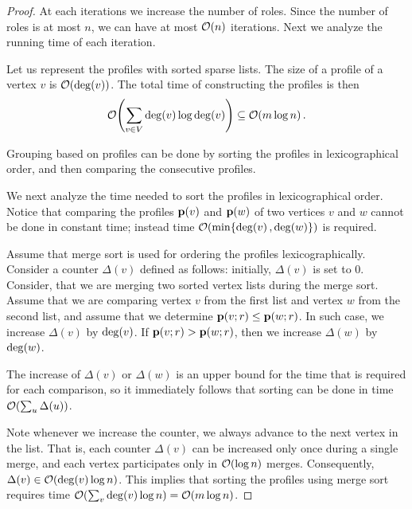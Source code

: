 \begin{proof}
At each iterations we increase the number of roles. Since the number of roles
is at most $n$, we can have at most $\bigO{n}$ iterations.
Next we analyze the running time of each iteration.

Let us represent the profiles with sorted sparse lists. The size of a profile
of a vertex $v$ is $\bigO{\dg{v}}$. The total time of constructing the profiles is
then
\[
	\bigO{\sum_{v \in V} \dg{v} \log \dg{v}} \subseteq \bigO{m \log n}.
\]

Grouping based on profiles can be done by sorting the profiles in
lexicographical order, and then comparing the consecutive profiles. 

We next analyze the time needed to sort the profiles in lexicographical order.
Notice that comparing the profiles  $\prof{v}$ and $\prof{w}$ of two vertices $v$ and $w$ 
cannot be done in constant time; 
instead time $\bigO{\min\{\dg{v}, \dg{w}\}}$ is required.

Assume that merge sort is used for ordering the profiles lexicographically.
Consider a counter $\Delta(v)$ defined as follows:
initially, $\Delta(v)$ is set to $0$.
Consider, that we are merging two sorted vertex lists during the merge sort.
Assume that we are comparing vertex $v$ from the first list and vertex $w$ from the second list,
and assume that we determine $\prof{v; \role} \leq \prof{w; \role}$.
In such case, we increase $\Delta(v)$ by $\dg{v}$.
If $\prof{v; \role} > \prof{w; \role}$, then we increase $\Delta(w)$ by $\dg{w}$.

The increase of $\Delta(v)$ or $\Delta(w)$ is an upper bound for the
time that is required for each comparison, so
it immediately follows that sorting can be done in time $\bigO{\sum_u \Delta(u)}$. 

Note whenever we increase the counter, we always advance to the next vertex in
the list. That is,
each counter $\Delta(v)$ can be increased only once during a single merge, 
and each vertex participates only in $\bigO{\log n}$ merges.
Consequently, $\Delta(v) \in \bigO{\dg{v} \log n}$. 
This implies that sorting the profiles using  merge sort requires time 
$\bigO{\sum_v \dg{v} \log n} = \bigO{m \log n}$.
\end{proof}
